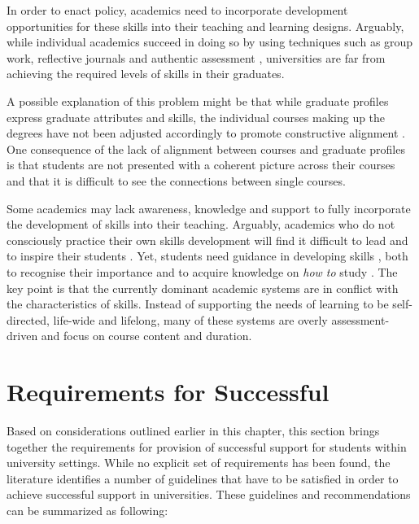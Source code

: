 In order to enact policy, academics need to incorporate development
opportunities for these skills into their teaching and learning designs.
Arguably, while individual academics succeed in doing so by using techniques
such as group work, reflective journals and authentic assessment
\citep{Clarke2003,Lombardi2008}, universities are far from achieving the
required levels of \LLLs skills in their graduates.

A possible explanation of this problem might be that while graduate profiles
express graduate attributes and \LLLs skills, the individual courses making up
the degrees have not been adjusted accordingly to promote constructive alignment
\citep{Hughes2010,Biggs2007}. One consequence of the lack of alignment between
courses and graduate profiles is that students are not presented with a coherent
picture across their courses and that it is difficult to see the connections
between single courses. 

Some academics may lack awareness, knowledge and support to fully incorporate
the development of \LLLs skills into their teaching. Arguably, academics who do
not consciously practice their own \LLLs skills development will find it
difficult to lead and to inspire their students \citep{Linden2003}. Yet,
students need guidance in developing \LLLs skills \citep{Leone2019}, both to
recognise their importance and to acquire knowledge on \textit{how to} study
\citep{Medel-Anonuevo2001}. The key point is that the currently dominant
academic systems are in conflict with the characteristics of \LLLs skills.
Instead of supporting the needs of learning to be self-directed, life-wide and
lifelong, many of these systems are overly assessment-driven and focus on course
content and duration.

\section{Requirements for Successful \LLLc}
\label{sec:needs}
Based on considerations outlined earlier in this chapter, this section brings
together the requirements for provision of successful \LLLs support for
students within university settings. While no explicit set of requirements has
been found, the literature identifies a number of guidelines that have to be
satisfied in order to achieve successful \LLLs support in universities. These
guidelines and recommendations can be summarized as following:
 
